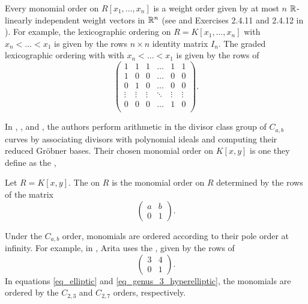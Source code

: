 Every monomial order on $R[x_1, \ldots, x_n]$ is a weight order given by at most $n$ $\mathbb{R}$-linearly independent weight vectors in $\mathbb{R}^n$
(see \cite{robbiano86} and Exercises 2.4.11 and 2.4.12 in \cite{cox07}).
For example, the lexicographic ordering on $R = K[x_1, \ldots, x_n]$ with $x_n < \dots < x_1$ is given by the rows $n \times n$ identity matrix $I_n$.
The graded lexicographic ordering with with $x_n < \dots < x_1$ is given by the rows of
  \[ \begin{pmatrix}
       1 & 1 & 1 & \dots & 1 & 1 \\
       1 & 0 & 0 & \dots & 0 & 0 \\
       0 & 1 & 0 & \dots & 0 & 0 \\
       \vdots & \vdots & \vdots & \ddots & \vdots & \vdots \\
       0 & 0 & 0 & \dots & 1 & 0 \\
     \end{pmatrix}. \]

In \cite{arita99}, \cite{arita03-1}, and \cite{harasawa00}, the authors perform arithmetic in the divisor class group of $C_{a,b}$ curves
by associating divisors with polynomial ideals and computing their reduced Gr\"obner bases.
Their chosen monomial order on $K[x,y]$ is one they define as the ,
\begin{definition}
  \label{def_cab_order}
  Let $R = K[x,y]$.
  The  on $R$ is the monomial order on $R$ determined by the rows of the matrix
  \[ \begin{pmatrix} a & b \\ 0 & 1 \end{pmatrix}. \]
\end{definition}
Under the $C_{a,b}$ order, monomials are ordered according to their pole order at infinity.
For example, in \cite{arita05-2}, Arita uses the ,
given by the rows of
\[ \begin{pmatrix} 3 & 4 \\ 0 & 1 \end{pmatrix}. \]
In equations \ref{eq_elliptic} and \ref{eq_genus_3_hyperelliptic},
the monomials are ordered by the $C_{2,3}$ and $C_{2,7}$ orders, respectively.




